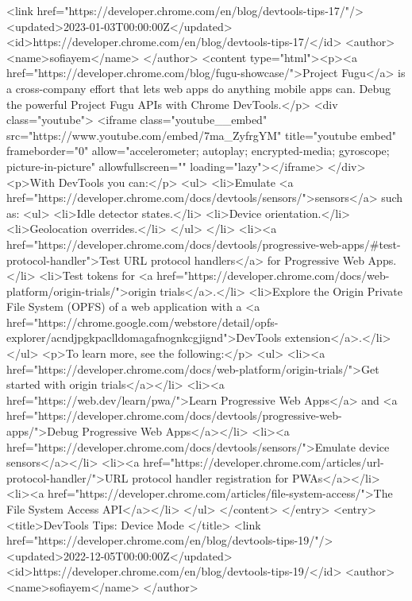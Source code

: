 <link href="https://developer.chrome.com/en/blog/devtools-tips-17/"/>
<updated>2023-01-03T00:00:00Z</updated>
<id>https://developer.chrome.com/en/blog/devtools-tips-17/</id>
<author>
<name>sofiayem</name>
</author>
<content type="html"><p><a href="https://developer.chrome.com/blog/fugu-showcase/">Project Fugu</a> is a cross-company effort that lets web apps do anything mobile apps can. Debug the powerful Project Fugu APIs with Chrome DevTools.</p> <div class="youtube"> <iframe class="youtube__embed" src="https://www.youtube.com/embed/7ma_ZyfrgYM" title="youtube embed" frameborder="0" allow="accelerometer; autoplay; encrypted-media; gyroscope; picture-in-picture" allowfullscreen="" loading="lazy"></iframe> </div> <p>With DevTools you can:</p> <ul> <li>Emulate <a href="https://developer.chrome.com/docs/devtools/sensors/">sensors</a> such as: <ul> <li>Idle detector states.</li> <li>Device orientation.</li> <li>Geolocation overrides.</li> </ul> </li> <li><a href="https://developer.chrome.com/docs/devtools/progressive-web-apps/#test-protocol-handler">Test URL protocol handlers</a> for Progressive Web Apps.</li> <li>Test tokens for <a href="https://developer.chrome.com/docs/web-platform/origin-trials/">origin trials</a>.</li> <li>Explore the Origin Private File System (OPFS) of a web application with a <a href="https://chrome.google.com/webstore/detail/opfs-explorer/acndjpgkpaclldomagafnognkcgjignd">DevTools extension</a>.</li> </ul> <p>To learn more, see the following:</p> <ul> <li><a href="https://developer.chrome.com/docs/web-platform/origin-trials/">Get started with origin trials</a></li> <li><a href="https://web.dev/learn/pwa/">Learn Progressive Web Apps</a> and <a href="https://developer.chrome.com/docs/devtools/progressive-web-apps/">Debug Progressive Web Apps</a></li> <li><a href="https://developer.chrome.com/docs/devtools/sensors/">Emulate device sensors</a></li> <li><a href="https://developer.chrome.com/articles/url-protocol-handler/">URL protocol handler registration for PWAs</a></li> <li><a href="https://developer.chrome.com/articles/file-system-access/">The File System Access API</a></li> </ul> </content>
</entry>
<entry>
<title>DevTools Tips: Device Mode </title>
<link href="https://developer.chrome.com/en/blog/devtools-tips-19/"/>
<updated>2022-12-05T00:00:00Z</updated>
<id>https://developer.chrome.com/en/blog/devtools-tips-19/</id>
<author>
<name>sofiayem</name>
</author>
